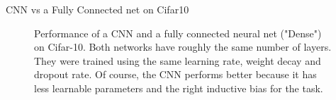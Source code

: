 \begin{frame} {CNN vs a Fully Connected net on Cifar10}
  \begin{figure}
        \centering
        \caption{Performance of a CNN and a fully connected neural net ("Dense") on Cifar-10. Both networks have roughly the same number of layers. They were trained using the same learning rate, weight decay and dropout rate. Of course, the CNN performs better because it has less learnable parameters and the right inductive bias for the task.}
    \end{figure} 
\end{frame}
